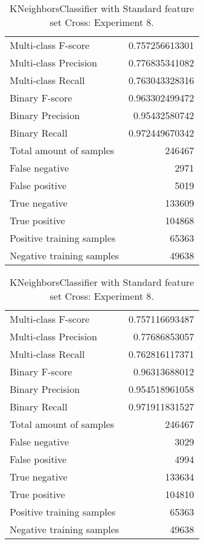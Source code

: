 \begin{table}[H]
\begin{minipage}{0.5\textwidth}
\caption{KNeighborsClassifier with Standard feature set Cross: Experiment 7.}
\centering
\begin{tabular}{l r}
\toprule
Multi-class F-score & 0.757256613301 \\
Multi-class Precision & 0.776835341082 \\
Multi-class Recall & 0.763043328316 \\
\midrule
Binary F-score & 0.963302499472 \\
Binary Precision & 0.95432580742 \\
Binary Recall & 0.972449670342 \\
\midrule
Total amount of samples & 246467 \\
False negative & 2971 \\
False positive & 5019 \\
True negative & 133609 \\
True positive & 104868 \\
\midrule
Positive training samples & 65363 \\
Negative training samples & 49638 \\
\bottomrule
\end{tabular}
\end{minipage}
\hfillx
\begin{minipage}{0.5\textwidth}
\caption{KNeighborsClassifier with Standard feature set Cross: Experiment 8.}
\centering
\begin{tabular}{l r}
\toprule
Multi-class F-score & 0.757116693487 \\
Multi-class Precision & 0.77686853057 \\
Multi-class Recall & 0.762816117371 \\
\midrule
Binary F-score & 0.96313688012 \\
Binary Precision & 0.954518961058 \\
Binary Recall & 0.971911831527 \\
\midrule
Total amount of samples & 246467 \\
False negative & 3029 \\
False positive & 4994 \\
True negative & 133634 \\
True positive & 104810 \\
\midrule
Positive training samples & 65363 \\
Negative training samples & 49638 \\
\bottomrule
\end{tabular}
\end{minipage}
\end{table}
